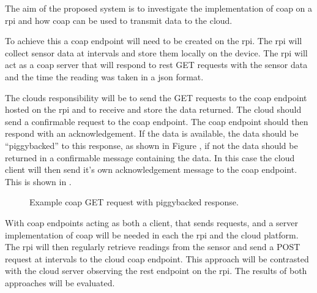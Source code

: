 The aim of the proposed system is to investigate the implementation of \gls{coap} on a \gls{rpi} and how \gls{coap} can be 
used to transmit data to the cloud. 

To achieve this a \gls{coap} endpoint will need to be created on the \gls{rpi}. The \gls{rpi} will collect sensor data at intervals and store them 
locally on the device. The \gls{rpi} will act as a \gls{coap} server that will respond to \gls{rest} GET requests with the sensor data and the time
the reading was taken in a \gls{json} format.

The clouds responsibility will be to send the GET requests to the \gls{coap} endpoint hosted on the \gls{rpi} and to receive and store the data
returned. The cloud should send a confirmable request to the \gls{coap} endpoint. The \gls{coap} endpoint should then respond with an acknowledgement. 
If the data is available, the data should be ``piggybacked'' to this response, as shown in Figure , if not the data should be 
returned in a confirmable message containing the data.
 In this case the cloud client will then send it's own acknowledgement message to the \gls{coap} endpoint. This is shown in  .

\begin{figure}[H]
    \centering
    \caption{\label{fig:coap_get_piggy} Example \gls{coap} GET request with piggybacked response. \citep{bormann2015constrained}}
\end{figure}

With \gls{coap} endpoints acting as both a client, that sends requests, and a server implementation of \gls{coap} will be needed 
in each the \gls{rpi} and the cloud platform. The \gls{rpi} will then regularly retrieve readings from the sensor and send a POST request 
at intervals to the cloud \gls{coap} endpoint. This approach will be contrasted with the cloud server observing the \gls{rest} endpoint on the \gls{rpi}.
The results of both approaches will be evaluated.

